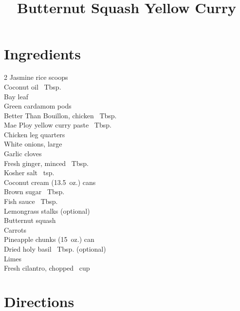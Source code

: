 \documentclass[11pt,letterpaper]{article}
\title{Butternut Squash Yellow Curry}
\author{}
\date{}
\begin{document}
\maketitle
\thispagestyle{empty}


\section*{Ingredients}

\setlength{\columnsep}{20pt}
\begin{multicols}{2}
\noindent
    Jasmine rice  scoops \\
    Coconut oil ~Tbsp. \\
    Bay leaf  \\
    Green cardamom pods  \\
    Better Than Bouillon, chicken ~Tbsp. \\
    Mae Ploy yellow curry paste ~Tbsp. \\
    Chicken leg quarters  \\
    White onions, large  \\
    Garlic cloves  \\
    \columnbreak
    Fresh ginger, minced ~Tbsp. \\
    Kosher salt \dotfill {}~tsp. \\
    Coconut cream  (13.5~oz.) cans \\
    Brown sugar ~Tbsp. \\
    Fish sauce ~Tbsp. \\
    Lemongrass stalks  (optional) \\
    Butternut squash  \\
    Carrots  \\
    Pineapple chunks  (15~oz.) can \\
    Dried holy basil ~Tbsp. (optional) \\
    Limes  \\
    Fresh cilantro, chopped ~cup \\
\end{multicols}

\section*{Directions}
\end{document}
